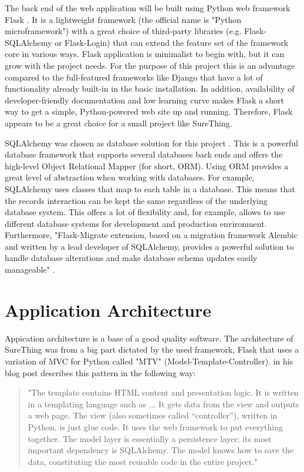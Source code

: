 The back end of the web application will be built using Python web framework Flask \cite{flask}. It is a lightweight framework (the official name is "Python microframework") with a great choice of third-party libraries (e.g. Flask-SQLAlchemy or Flask-Login) that can extend the feature set of the framework core in various ways. Flask application is minimalist to begin with, but it can grow with the project needs. For the purpose of this project this is an advantage compared to the full-featured frameworks like Django that have a lot of functionality already built-in in the basic installation. In addition, availability of developer-friendly documentation and low learning curve makes Flask a short way to get a simple, Python-powered web site up and running. Therefore, Flask appears to be a great choice for a small project like SureThing. 

SQLAlchemy was chosen as database solution for this project \cite{sqlalchemy}. This is a powerful database framework that supports several databases back ends and offers the high-level Object Relational Mapper (for short, ORM). Using ORM provides a great level of abstraction when working with databases. For example, SQLAlchemy uses classes that map to each table in a database. This means that the records interaction can be kept the same regardless of the underlying database system. This offers a lot of flexibility and, for example, allows to use different database systems for development and production environment. Furthermore, "Flask-Migrate extension, based on a migration framework Alembic and written by a lead developer of SQLAlchemy, provides a powerful solution to handle database alterations and make database schema updates easily manageable" \cite{book:Grindberg2014FlaskWebDevelopment}.

\section{Application Architecture}
Appication architecture is a base of a good quality software. The architecture of SureThing was from a big part dictated by the used framework, Flask that uses a variation of MVC for Python called "MTV" (Model-Template-Controller). \citet{article:goodArchitecture} in his blog post describes this pattern in the following way:

\begin{quote}
"The template contains HTML content and presentation logic. It is written in a templating language such as ... It gets data from the view and outputs a web page. The view (also sometimes called “controller”), written in Python, is just glue code. It uses the web framework to put everything together. The model layer is essentially a persistence layer: its most important dependency is SQLAlchemy. The model knows how to save the data, constituting the most reusable code in the entire project."
\end{quote}

